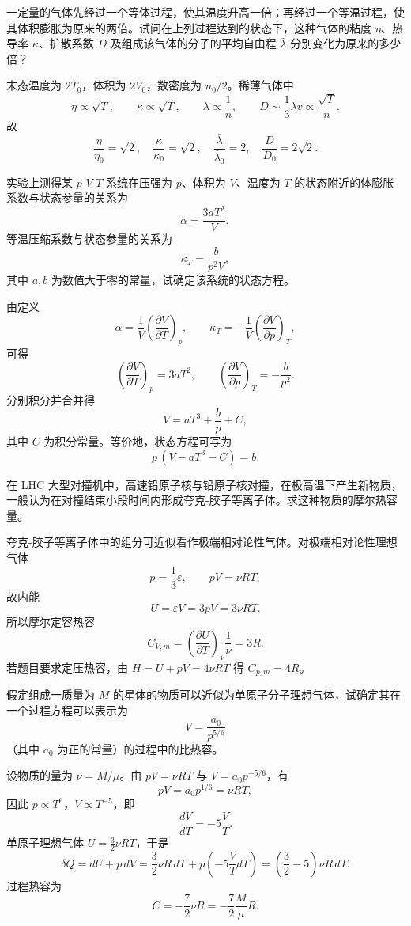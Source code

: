 \begin{question}
一定量的气体先经过一个等体过程，使其温度升高一倍；再经过一个等温过程，使其体积膨胀为原来的两倍。试问在上列过程达到的状态下，这种气体的粘度 $\eta$、热导率 $\kappa$、扩散系数 $D$ 及组成该气体的分子的平均自由程 $\bar\lambda$ 分别变化为原来的多少倍？
\begin{solution}
末态温度为 $2T_0$，体积为 $2V_0$，数密度为 $n_0/2$。稀薄气体中
\[
\eta\propto \sqrt T,
\qquad \kappa\propto \sqrt T,
\qquad \bar\lambda\propto \frac1n,
\qquad D\sim \frac13\bar\lambda\bar v\propto \frac{\sqrt T}{n}.
\]
故
\[
\frac{\eta}{\eta_0}=\sqrt2,\quad
\frac{\kappa}{\kappa_0}=\sqrt2,
\quad
\frac{\bar\lambda}{\bar\lambda_0}=2,
\quad
\frac{D}{D_0}=2\sqrt2.
\]
\end{solution}
\end{question}

\begin{question}
实验上测得某 $p$-$V$-$T$ 系统在压强为 $p$、体积为 $V$、温度为 $T$ 的状态附近的体膨胀系数与状态参量的关系为
\[
\alpha=\frac{3aT^2}{V},
\]
等温压缩系数与状态参量的关系为
\[
\kappa_T=\frac{b}{p^2V},
\]
其中 $a,b$ 为数值大于零的常量，试确定该系统的状态方程。
\begin{solution}
由定义
\[
\alpha=\frac1V\left(\frac{\partial V}{\partial T}\right)_p,
\qquad
\kappa_T=-\frac1V\left(\frac{\partial V}{\partial p}\right)_T,
\]
可得
\[
\left(\frac{\partial V}{\partial T}\right)_p=3aT^2,
\qquad
\left(\frac{\partial V}{\partial p}\right)_T=-\frac{b}{p^2}.
\]
分别积分并合并得
\[
V=aT^3+\frac{b}{p}+C,
\]
其中 $C$ 为积分常量。等价地，状态方程可写为
\[
p\,(V-aT^3-C)=b.
\]
\end{solution}
\end{question}

\begin{question}
在 LHC 大型对撞机中，高速铅原子核与铅原子核对撞，在极高温下产生新物质，一般认为在对撞结束小段时间内形成夸克-胶子等离子体。求这种物质的摩尔热容量。
\begin{solution}
夸克-胶子等离子体中的组分可近似看作极端相对论性气体。对极端相对论性理想气体
\[
p=\frac13\varepsilon,
\qquad pV=\nu RT,
\]
故内能
\[
U=\varepsilon V=3pV=3\nu RT.
\]
所以摩尔定容热容
\[
C_{V,m}=\left(\frac{\partial U}{\partial T}\right)_V\frac1\nu=3R.
\]
若题目要求定压热容，由 $H=U+pV=4\nu RT$ 得 $C_{p,m}=4R$。
\end{solution}
\end{question}

\begin{question}
假定组成一质量为 $M$ 的星体的物质可以近似为单原子分子理想气体，试确定其在一个过程方程可以表示为
\[
V=\frac{a_0}{p^{5/6}}
\]
（其中 $a_0$ 为正的常量）的过程中的比热容。
\begin{solution}
设物质的量为 $\nu=M/\mu$。由 $pV=\nu RT$ 与 $V=a_0p^{-5/6}$，有
\[
pV=a_0p^{1/6}=\nu RT,
\]
因此 $p\propto T^6$，$V\propto T^{-5}$，即
\[
\frac{dV}{dT}=-5\frac{V}{T}.
\]
单原子理想气体 $U=\frac32\nu RT$，于是
\[
\delta Q=dU+p\,dV=\frac32\nu R\,dT+p\left(-5\frac{V}{T}dT\right)
=\left(\frac32-5\right)\nu R\,dT.
\]
过程热容为
\[
C=-\frac72\nu R=-\frac72\frac{M}{\mu}R.
\]
\end{solution}
\end{question}

